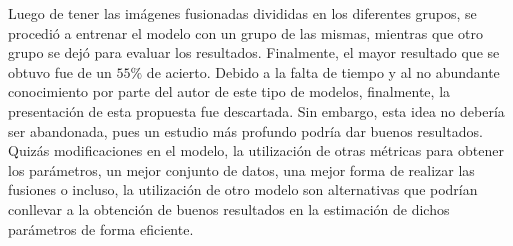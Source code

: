 Luego de tener las im\'agenes fusionadas divididas en los diferentes grupos, se procedi\'o a entrenar el modelo con un grupo de las mismas, mientras que otro grupo se dej\'o para evaluar los resultados. Finalmente, el mayor resultado que se obtuvo fue de un $55\%$ de acierto. Debido a la falta de tiempo y al no abundante conocimiento por parte del autor de este tipo de modelos, finalmente, la presentaci\'on de esta propuesta fue descartada. Sin embargo, esta idea no deber\'ia ser abandonada, pues un estudio m\'as profundo podr\'ia dar buenos resultados. Quiz\'as modificaciones en el modelo, la utilizaci\'on de otras m\'etricas para obtener los par\'ametros, un mejor conjunto de datos, una mejor forma de realizar las fusiones o incluso, la utilizaci\'on de otro modelo son alternativas que podr\'ian conllevar a la obtenci\'on de buenos resultados en la estimaci\'on de dichos par\'ametros de forma eficiente.